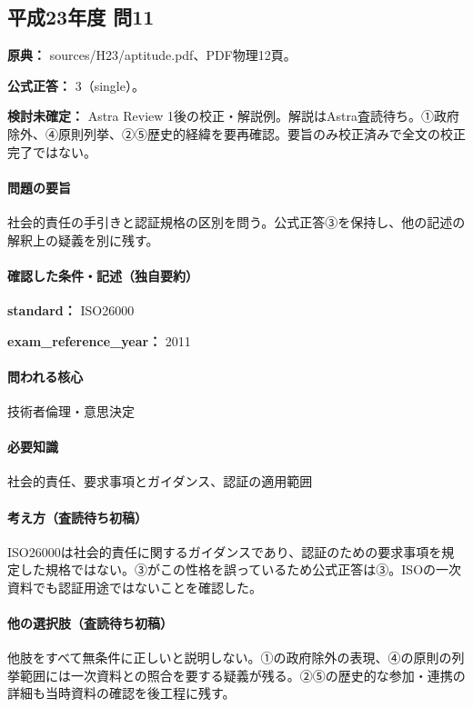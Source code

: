 \subsection{平成23年度 問11}
\label{q:h23-reg-apt-11}

\noindent\textbf{原典：} sources/H23/aptitude.pdf、PDF物理12頁。

\textbf{公式正答：} 3（single）。

\par\textbf{検討未確定：} Astra Review 1後の校正・解説例。解説はAstra査読待ち。①政府除外、④原則列挙、②⑤歴史的経緯を要再確認。要旨のみ校正済みで全文の校正完了ではない。

\paragraph{問題の要旨} 社会的責任の手引きと認証規格の区別を問う。公式正答③を保持し、他の記述の解釈上の疑義を別に残す。

\paragraph{確認した条件・記述（独自要約）}\mbox{}\par

\noindent\textbf{standard：} ISO26000\par

\noindent\textbf{exam\_reference\_year：} 2011\par

\paragraph{問われる核心} 技術者倫理・意思決定

\paragraph{必要知識} 社会的責任、要求事項とガイダンス、認証の適用範囲

\paragraph{考え方（査読待ち初稿）} ISO26000は社会的責任に関するガイダンスであり、認証のための要求事項を規定した規格ではない。③がこの性格を誤っているため公式正答は③。ISOの一次資料でも認証用途ではないことを確認した。

\paragraph{他の選択肢（査読待ち初稿）} 他肢をすべて無条件に正しいと説明しない。①の政府除外の表現、④の原則の列挙範囲には一次資料との照合を要する疑義が残る。②⑤の歴史的な参加・連携の詳細も当時資料の確認を後工程に残す。

